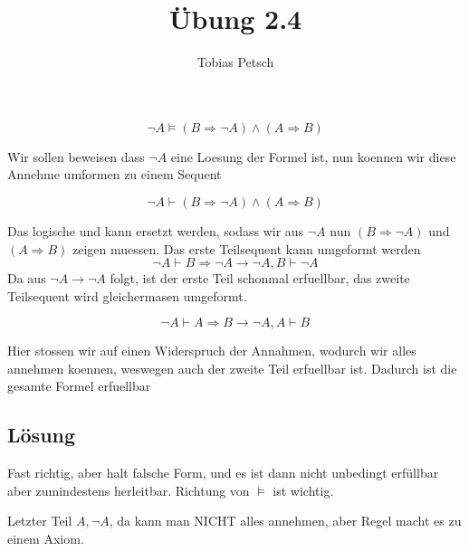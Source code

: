 \documentclass[a4paper,12pt]{article}
\title{Übung 2.4}
\author{Tobias Petsch}
\date{}
\begin{document}
\maketitle

\[
\neg A \models (B \Rightarrow \neg A) \land (A \Rightarrow B)
\]

Wir sollen beweisen dass $\neg A$ eine Loesung der Formel ist, nun koennen wir diese Annehme umformen zu einem Sequent

\[
\neg A \vdash (B \Rightarrow \neg A) \land (A \Rightarrow B)
\]

Das logische und kann ersetzt werden, sodass wir aus $\neg A$ nun $(B \Rightarrow \neg A)$ und $(A \Rightarrow B)$
zeigen muessen. Das erste Teilsequent kann umgeformt werden \\
\[
\neg A \vdash B \Rightarrow \neg A \rightarrow \neg A,B \vdash \neg A
\] 
Da aus $\neg A \rightarrow \neg A$ folgt, ist der erste Teil schonmal erfuellbar, das zweite Teilsequent wird gleichermasen umgeformt.

\[
\neg A \vdash A \Rightarrow B \rightarrow \neg A,A \vdash B
\]

Hier stossen wir auf einen Widerspruch der Annahmen, wodurch wir alles annehmen koennen, weswegen auch der zweite Teil erfuellbar ist.
Dadurch ist die gesamte Formel erfuellbar

\subsection*{Lösung}
Fast richtig, aber halt falsche Form, und es ist dann nicht unbedingt erfüllbar aber zumindestens herleitbar.
Richtung von $\models$ ist wichtig. 

Letzter Teil $A, \neg A$, da kann man NICHT alles annehmen, aber Regel macht es zu einem Axiom.


\end{document}
